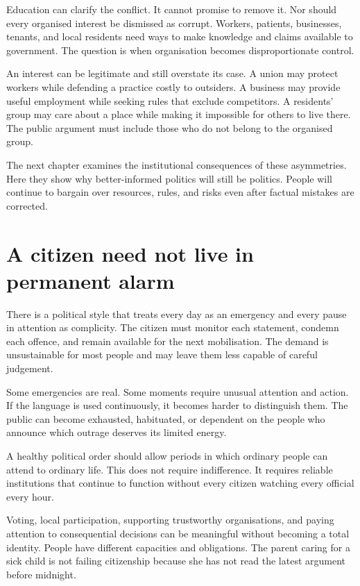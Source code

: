 \documentclass[12pt,a4paper]{book}
\begin{document}
Education can clarify the conflict. It cannot promise to remove it. Nor should every organised interest be dismissed as corrupt. Workers, patients, businesses, tenants, and local residents need ways to make knowledge and claims available to government. The question is when organisation becomes disproportionate control.

An interest can be legitimate and still overstate its case. A union may protect workers while defending a practice costly to outsiders. A business may provide useful employment while seeking rules that exclude competitors. A residents' group may care about a place while making it impossible for others to live there. The public argument must include those who do not belong to the organised group.

The next chapter examines the institutional consequences of these asymmetries. Here they show why better-informed politics will still be politics. People will continue to bargain over resources, rules, and risks even after factual mistakes are corrected.

\section*{A citizen need not live in permanent alarm}

There is a political style that treats every day as an emergency and every pause in attention as complicity. The citizen must monitor each statement, condemn each offence, and remain available for the next mobilisation. The demand is unsustainable for most people and may leave them less capable of careful judgement.

Some emergencies are real. Some moments require unusual attention and action. If the language is used continuously, it becomes harder to distinguish them. The public can become exhausted, habituated, or dependent on the people who announce which outrage deserves its limited energy.

A healthy political order should allow periods in which ordinary people can attend to ordinary life. This does not require indifference. It requires reliable institutions that continue to function without every citizen watching every official every hour.

Voting, local participation, supporting trustworthy organisations, and paying attention to consequential decisions can be meaningful without becoming a total identity. People have different capacities and obligations. The parent caring for a sick child is not failing citizenship because she has not read the latest argument before midnight.
\end{document}
